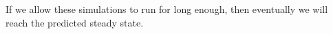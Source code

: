 \documentclass[11pt]{article} %
\begin{document}
If we allow these simulations to run for long enough, then eventually we will reach the predicted steady state.







\clearpage{}   %
{} %


\end{document}
